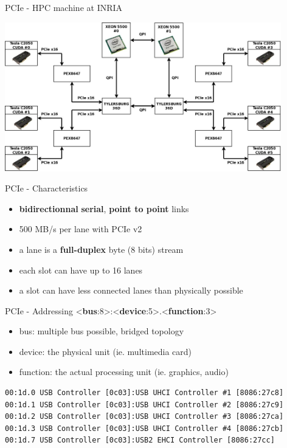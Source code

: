 \begin{frame}{PCIe - HPC machine at INRIA}
  \begin{center}
    \includegraphics[width=0.9\textwidth]{figures/idgraph_bus_topo.jpg}
  \end{center}
\end{frame}

\begin{frame}{PCIe - Characteristics}
  \begin{itemize}
  \item \textbf{bidirectionnal} \textbf{serial}, \textbf{point to point} links
  \item 500 MB/s per lane with PCIe v2
  \item a lane is a \textbf{full-duplex} byte (8 bits) stream
  \item each slot can have up to 16 lanes
  \item a slot can have less connected lanes than physically possible
  \end{itemize}
\end{frame}

\begin{frame}[containsverbatim]{PCIe - Addressing}
  <\textbf{bus}:8>:<\textbf{device}:5>.<\textbf{function}:3>
  \begin{itemize}
  \item bus: multiple bus possible, bridged topology 
  \item device: the physical unit (ie. multimedia card)
  \item function: the actual processing unit (ie. graphics, audio)
  \end{itemize}

  \smallskip
\begin{verbatim}
00:1d.0 USB Controller [0c03]:USB UHCI Controller #1 [8086:27c8]
00:1d.1 USB Controller [0c03]:USB UHCI Controller #2 [8086:27c9]
00:1d.2 USB Controller [0c03]:USB UHCI Controller #3 [8086:27ca]
00:1d.3 USB Controller [0c03]:USB UHCI Controller #4 [8086:27cb]
00:1d.7 USB Controller [0c03]:USB2 EHCI Controller [8086:27cc]
\end{verbatim}

\end{frame}


